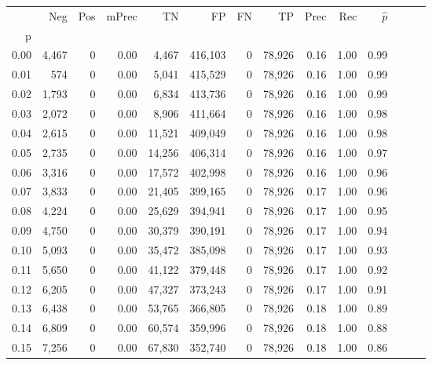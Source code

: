 \begin{tabular}{rrrrrrrrrrrrrr}
\toprule
{} &    Neg &    Pos & mPrec &       TN &       FP &      FN &      TP &  Prec &   Rec & $\hat{p}$ \\
p    &        &        &       &          &          &         &         &       &       &           \\
\midrule
0.00 &  4,467 &      0 &  0.00 &    4,467 &  416,103 &       0 &  78,926 &  0.16 &  1.00 &      0.99 \\
0.01 &    574 &      0 &  0.00 &    5,041 &  415,529 &       0 &  78,926 &  0.16 &  1.00 &      0.99 \\
0.02 &  1,793 &      0 &  0.00 &    6,834 &  413,736 &       0 &  78,926 &  0.16 &  1.00 &      0.99 \\
0.03 &  2,072 &      0 &  0.00 &    8,906 &  411,664 &       0 &  78,926 &  0.16 &  1.00 &      0.98 \\
0.04 &  2,615 &      0 &  0.00 &   11,521 &  409,049 &       0 &  78,926 &  0.16 &  1.00 &      0.98 \\
0.05 &  2,735 &      0 &  0.00 &   14,256 &  406,314 &       0 &  78,926 &  0.16 &  1.00 &      0.97 \\
0.06 &  3,316 &      0 &  0.00 &   17,572 &  402,998 &       0 &  78,926 &  0.16 &  1.00 &      0.96 \\
0.07 &  3,833 &      0 &  0.00 &   21,405 &  399,165 &       0 &  78,926 &  0.17 &  1.00 &      0.96 \\
0.08 &  4,224 &      0 &  0.00 &   25,629 &  394,941 &       0 &  78,926 &  0.17 &  1.00 &      0.95 \\
0.09 &  4,750 &      0 &  0.00 &   30,379 &  390,191 &       0 &  78,926 &  0.17 &  1.00 &      0.94 \\
0.10 &  5,093 &      0 &  0.00 &   35,472 &  385,098 &       0 &  78,926 &  0.17 &  1.00 &      0.93 \\
0.11 &  5,650 &      0 &  0.00 &   41,122 &  379,448 &       0 &  78,926 &  0.17 &  1.00 &      0.92 \\
0.12 &  6,205 &      0 &  0.00 &   47,327 &  373,243 &       0 &  78,926 &  0.17 &  1.00 &      0.91 \\
0.13 &  6,438 &      0 &  0.00 &   53,765 &  366,805 &       0 &  78,926 &  0.18 &  1.00 &      0.89 \\
0.14 &  6,809 &      0 &  0.00 &   60,574 &  359,996 &       0 &  78,926 &  0.18 &  1.00 &      0.88 \\
0.15 &  7,256 &      0 &  0.00 &   67,830 &  352,740 &       0 &  78,926 &  0.18 &  1.00 &      0.86 \\

\end{tabular}
